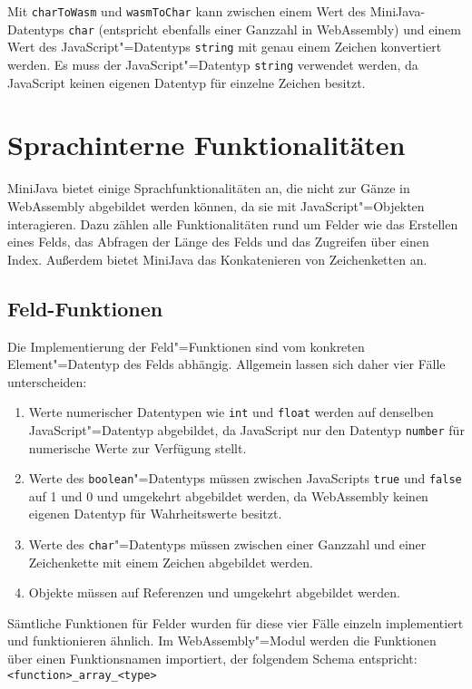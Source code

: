 Mit \lstinline{charToWasm} und \lstinline{wasmToChar} kann zwischen einem Wert des MiniJava-Datentyps \lstinline{char} (entspricht ebenfalls einer Ganzzahl in WebAssembly) und einem Wert des JavaScript"=Datentyps \lstinline{string} mit genau einem Zeichen konvertiert werden.
Es muss der JavaScript"=Datentyp \lstinline{string} verwendet werden, da JavaScript keinen eigenen Datentyp für einzelne Zeichen besitzt.

\section{Sprachinterne Funktionalitäten}
\label{sec:Sprachinterne-Funktionalitäten}

MiniJava bietet einige Sprachfunktionalitäten an, die nicht zur Gänze in WebAssembly abgebildet werden können, da sie mit JavaScript"=Objekten interagieren. Dazu zählen alle Funktionalitäten rund um Felder wie das Erstellen eines Felds, das Abfragen der Länge des Felds und das Zugreifen über einen Index. Außerdem bietet MiniJava das Konkatenieren von Zeichenketten an.

\subsection{Feld-Funktionen}
\label{subsec:Feld-Funktionen}

Die Implementierung der Feld"=Funktionen sind vom konkreten Element"=Datentyp des Felds abhängig. Allgemein lassen sich daher vier Fälle unterscheiden:

\begin{enumerate}
    \item Werte numerischer Datentypen wie \lstinline{int} und \lstinline{float} werden auf denselben JavaScript"=Datentyp abgebildet, da JavaScript nur den Datentyp \lstinline{number} für numerische Werte zur Verfügung stellt.
    \item Werte des \lstinline{boolean}"=Datentyps müssen zwischen JavaScripts \lstinline{true} und \lstinline{false} auf 1 und 0 und umgekehrt abgebildet werden, da WebAssembly keinen eigenen Datentyp für Wahrheitswerte besitzt.
    \item Werte des \lstinline{char}"=Datentyps müssen zwischen einer Ganzzahl und einer Zeichenkette mit einem Zeichen abgebildet werden.
    \item Objekte  müssen auf Referenzen und umgekehrt abgebildet werden. 
\end{enumerate}

Sämtliche Funktionen für Felder wurden für diese vier Fälle einzeln implementiert und funktionieren ähnlich. Im WebAssembly"=Modul werden die Funktionen über einen Funktionsnamen importiert, der folgendem Schema entspricht: \lstinline{<function>_array_<type>}

